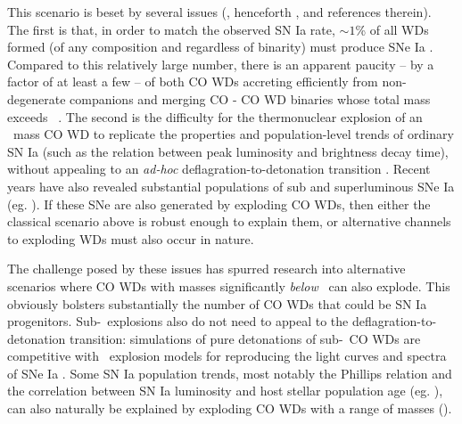 This scenario is beset by several issues (\citealt{vkercj10}, henceforth \citeal{vkercj10}, and references therein).  The first is that, in order to match the observed SN Ia rate, $\sim1$\% of all WDs formed (of any composition and regardless of binarity) must produce SNe Ia \citep{prichs08, vker13}.  Compared to this relatively large number, there is an apparent paucity -- by a factor of at least a few  -- of both CO WDs accreting efficiently from non-degenerate companions \citep{none} and merging CO - CO WD binaries whose total mass exceeds \Mch\ \citep{badem12}.  The second is the difficulty for the thermonuclear explosion of an \Mch\ mass CO WD to replicate the properties and population-level trends of ordinary SN Ia (such as the \cite{phil93} relation between peak luminosity and brightness decay time), without appealing to an \textit{ad-hoc} deflagration-to-detonation transition \citep{khok91}.  Recent years have also revealed substantial populations of sub and superluminous SNe Ia (eg. \cite{none}).  If these SNe are also generated by exploding CO WDs, then either the classical scenario above is robust enough to explain them, or alternative channels to exploding WDs must also occur in nature.



The challenge posed by these issues has spurred research into alternative scenarios where CO WDs with masses significantly \textit{below} \Mch\ can also explode.  This obviously bolsters substantially the number of CO WDs that could be SN Ia progenitors.  Sub-\Mch\ explosions also do not need to appeal to the deflagration-to-detonation transition: simulations of pure detonations of sub-\Mch\ CO WDs \citep{shig+92, sim+10} are competitive with \Mch\ explosion models for reproducing the light curves and spectra of SNe Ia \citep{none}.  Some SN Ia population trends, most notably the Phillips relation and the correlation between SN Ia luminosity and host stellar population age (eg. \cite{none}), can also naturally be explained by exploding CO WDs with a range of masses (\citeal{vkercj10}).

